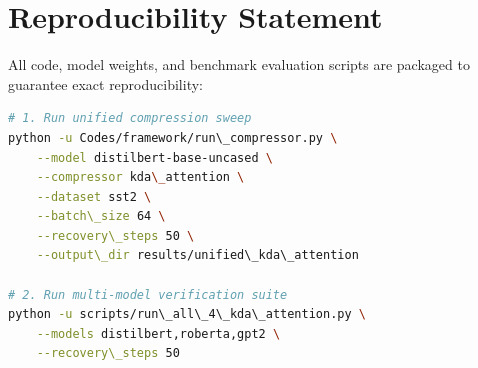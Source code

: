 \section{Reproducibility Statement}
All code, model weights, and benchmark evaluation scripts are packaged to guarantee exact reproducibility:
\begin{lstlisting}[language=bash]
# 1. Run unified compression sweep
python -u Codes/framework/run\_compressor.py \
    --model distilbert-base-uncased \
    --compressor kda\_attention \
    --dataset sst2 \
    --batch\_size 64 \
    --recovery\_steps 50 \
    --output\_dir results/unified\_kda\_attention

# 2. Run multi-model verification suite
python -u scripts/run\_all\_4\_kda\_attention.py \
    --models distilbert,roberta,gpt2 \
    --recovery\_steps 50
\end{lstlisting}
